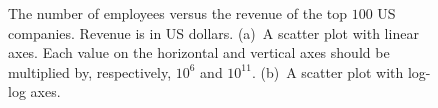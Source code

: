 \documentclass[a4paper,oneside,12pt]{article}
\begin{document}
\begin{figure}[!htbp]
\centering
{}
\caption{%
  The number of employees versus the revenue of the top $100$ US
  companies.  Revenue is in US dollars.  (a)~A scatter plot with
  linear axes.  Each value on the horizontal and vertical axes should
  be multiplied by, respectively, $10^6$ and $10^{11}$.  (b)~A scatter
  plot with log-log axes.
}
\label{fig:logarithm:Fortune100}
\end{figure}
\end{document}
